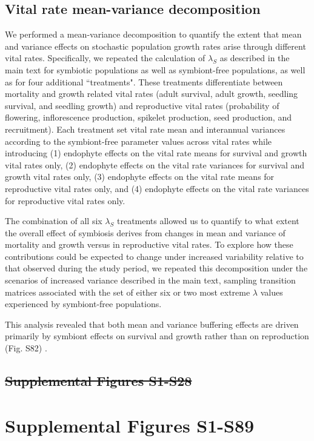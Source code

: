 \documentclass[lineno, sn-basic]{sn-jnl}%
\providecommand{\DIFadd}[1]{{\protect\color{blue}#1}} %
\providecommand{\DIFdel}[1]{{\protect\color{red}\protect\scriptsize\sout{#1}}}
\providecommand{\DIFadd}[1]{{\protect\color{blue}\uwave{#1}}} %
\providecommand{\DIFdel}[1]{{\protect\color{red}\sout{#1}}}                      %
\providecommand{\DIFaddbegin}{} %
\providecommand{\DIFaddend}{} %
\providecommand{\DIFdelbegin}{} %
\providecommand{\DIFdelend}{} %
\newcommand{\DIFscaledelfig}{0.5}
\newlength{\DIFdelgraphicswidth} %
\newlength{\DIFdelgraphicsheight} %
\newcommand{\DIFaddincludegraphics}[2][]{{\color{blue}\fbox{\DIFOincludegraphics[#1]{#2}}}} %
\newcommand{\DIFdelincludegraphics}[2][]{%
\sbox{\DIFdelgraphicsbox}{\DIFOincludegraphics[#1]{#2}}%
\settoboxwidth{\DIFdelgraphicswidth}{\DIFdelgraphicsbox} %
\settoboxtotalheight{\DIFdelgraphicsheight}{\DIFdelgraphicsbox} %
\scalebox{\DIFscaledelfig}{%
\parbox[b]{\DIFdelgraphicswidth}{\usebox{\DIFdelgraphicsbox}\\[-\baselineskip] \rule{\DIFdelgraphicswidth}{0em}}\llap{\resizebox{\DIFdelgraphicswidth}{\DIFdelgraphicsheight}{%
\setlength{\unitlength}{\DIFdelgraphicswidth}%
\begin{picture}(1,1)%
\thicklines\linethickness{2pt} %
{\color[rgb]{1,0,0}\put(0,0){\framebox(1,1){}}}%
{\color[rgb]{1,0,0}\put(0,0){\line( 1,1){1}}}%
{\color[rgb]{1,0,0}\put(0,1){\line(1,-1){1}}}%
\end{picture}%
}\hspace*{3pt}}} %
} %
\DeclareRobustCommand{\DIFaddbegin}{\DIFOaddbegin \let\includegraphics\DIFaddincludegraphics} %
\DeclareRobustCommand{\DIFaddend}{\DIFOaddend \let\includegraphics\DIFOincludegraphics} %
\DeclareRobustCommand{\DIFdelbegin}{\DIFOdelbegin \let\includegraphics\DIFdelincludegraphics} %
\DeclareRobustCommand{\DIFdelend}{\DIFOaddend \let\includegraphics\DIFOincludegraphics} %
\begin{document}
\subsection{\DIFadd{Vital rate mean-variance decomposition}}\label{SupMethods5}
\DIFadd{We performed a mean-variance decomposition to quantify the extent that mean and variance effects on stochastic population growth rates arise through different vital rates. 
Specifically, we repeated the calculation of $\lambda_S$ as described in the main text for symbiotic populations as well as symbiont-free populations, as well as for four additional ``treatments". 
These treatments differentiate between mortality and growth related vital rates (adult survival, adult growth, seedling survival, and seedling growth) and reproductive vital rates (probability of flowering, inflorescence production, spikelet production, seed production, and recruitment). 
Each treatment set vital rate mean and interannual variances according to the symbiont-free parameter values across vital rates while introducing (1) endophyte effects on the vital rate means for survival and growth vital rates only, (2) endophyte effects on the vital rate variances for survival and growth vital rates only, (3) endophyte effects on the vital rate means for reproductive vital rates only, and (4) endophyte effects on the vital rate variances for reproductive vital rates only.
}

\DIFadd{The combination of all six $\lambda_S$ treatments allowed us to quantify to what extent the overall effect of symbiosis derives from changes in mean and variance of mortality and growth versus in reproductive vital rates. 
To explore how these contributions could be expected to change under increased variability relative to that observed during the study period, we repeated this decomposition under the scenarios of increased variance described in the main text, sampling transition matrices associated with the set of either six or two most extreme $\lambda$ values experienced by symbiont-free populations.
}

\DIFadd{This analysis revealed that both mean and variance buffering effects are driven primarily by symbiont effects on survival and growth rather than on reproduction (Fig. S82) .
}

\DIFaddend \newpage


\DIFdelbegin \subsection*{\DIFdel{Supplemental Figures S1-S28}}%
\DIFdelend \DIFaddbegin \section{\DIFadd{Supplemental Figures S1-S89}}\label{Supfigs}
\DIFaddend 
\end{document}
